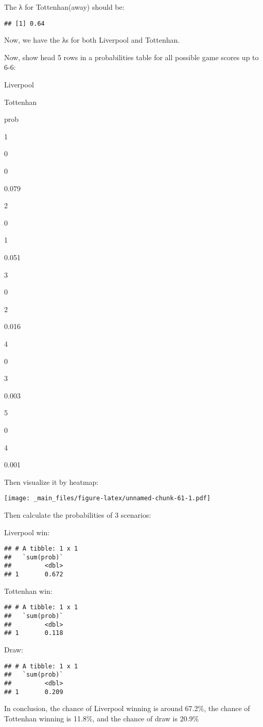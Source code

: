 \documentclass[
]{article}
\begin{document}
The λ for Tottenhan(away) should be:

\begin{verbatim}
## [1] 0.64
\end{verbatim}

Now, we have the λs for both Liverpool and Tottenhan.

Now, show head 5 rows in a probabilities table for all possible game scores up to 6-6:

Liverpool

Tottenhan

prob

1

0

0

0.079

2

0

1

0.051

3

0

2

0.016

4

0

3

0.003

5

0

4

0.001

Then visualize it by heatmap:

\texttt{[image: \_main\_files/figure-latex/unnamed-chunk-61-1.pdf]}

Then calculate the probabilities of 3 scenarios:

Liverpool win:

\begin{verbatim}
## # A tibble: 1 x 1
##   `sum(prob)`
##         <dbl>
## 1       0.672
\end{verbatim}

Tottenhan win:

\begin{verbatim}
## # A tibble: 1 x 1
##   `sum(prob)`
##         <dbl>
## 1       0.118
\end{verbatim}

Draw:

\begin{verbatim}
## # A tibble: 1 x 1
##   `sum(prob)`
##         <dbl>
## 1       0.209
\end{verbatim}

In conclusion, the chance of Liverpool winning is around 67.2\%, the chance of Tottenhan winning is 11.8\%, and the chance of draw is 20.9\%
\end{document}
